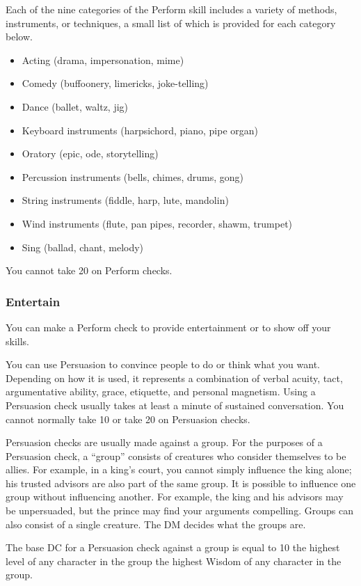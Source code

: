 Each of the nine categories of the Perform skill includes a variety of methods, instruments, or techniques, a small list of which is provided for each category below.
\begin{itemize}
\item Acting (drama, impersonation, mime)
\item Comedy (buffoonery, limericks, joke-telling)
\item Dance (ballet, waltz, jig)
\item Keyboard instruments (harpsichord, piano, pipe organ)
\item Oratory (epic, ode, storytelling)
\item Percussion instruments (bells, chimes, drums, gong)
\item String instruments (fiddle, harp, lute, mandolin)
\item Wind instruments (flute, pan pipes, recorder, shawm, trumpet)
\item Sing (ballad, chant, melody)
\end{itemize}

You cannot take 20 on Perform checks.

\subsubsection{Entertain}
You can make a Perform check to provide entertainment or to show off your skills.

You can use Persuasion to convince people to do or think what you want. Depending on how it is used, it represents a combination of verbal acuity, tact, argumentative ability, grace, etiquette, and personal magnetism. Using a Persuasion check usually takes at least a minute of sustained conversation. You cannot normally take 10 or take 20 on Persuasion checks.

Persuasion checks are usually made against a group. For the purposes of a Persuasion check, a ``group'' consists of creatures who consider themselves to be allies. For example, in a king's court, you cannot simply influence the king alone; his trusted advisors are also part of the same group. It is possible to influence one group without influencing another. For example, the king and his advisors may be unpersuaded, but the prince may find your arguments compelling. Groups can also consist of a single creature. The DM decides what the groups are.

The base DC for a Persuasion check against a group is equal to 10 \add the highest level of any character in the group \add the highest Wisdom of any character in the group.

